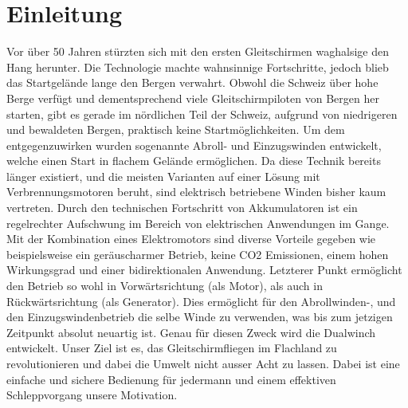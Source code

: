 \section{Einleitung}
Vor über 50 Jahren stürzten sich mit den ersten Gleitschirmen waghalsige den Hang herunter. Die Technologie machte wahnsinnige Fortschritte, jedoch blieb das Startgelände lange den Bergen verwahrt. Obwohl die Schweiz über hohe Berge verfügt und dementsprechend viele Gleitschirmpiloten von Bergen her starten, gibt es gerade im nördlichen Teil der Schweiz, aufgrund von niedrigeren und bewaldeten Bergen, praktisch keine Startmöglichkeiten. Um dem entgegenzuwirken wurden sogenannte Abroll- und Einzugswinden entwickelt, welche einen Start in flachem Gelände ermöglichen. Da diese Technik bereits länger existiert, und die meisten Varianten auf einer Lösung mit Verbrennungsmotoren beruht, sind elektrisch betriebene Winden bisher kaum vertreten. Durch den technischen Fortschritt von Akkumulatoren ist ein regelrechter Aufschwung im Bereich von elektrischen Anwendungen im Gange. Mit der Kombination eines Elektromotors sind diverse Vorteile gegeben wie beispielsweise ein geräuscharmer Betrieb, keine CO2 Emissionen, einem hohen Wirkungsgrad und einer bidirektionalen Anwendung. Letzterer Punkt ermöglicht den Betrieb so wohl in Vorwärtsrichtung (als Motor), als auch in Rückwärtsrichtung (als Generator). Dies ermöglicht für den Abrollwinden-, und den Einzugswindenbetrieb die selbe Winde zu verwenden, was bis zum jetzigen Zeitpunkt absolut neuartig ist. Genau für diesen Zweck wird die Dualwinch entwickelt. Unser Ziel ist es, das Gleitschirmfliegen im Flachland zu revolutionieren und dabei die Umwelt nicht ausser Acht zu lassen. Dabei ist eine einfache und sichere Bedienung für jedermann und einem effektiven Schleppvorgang unsere Motivation.


